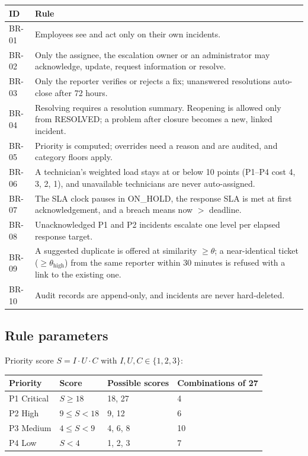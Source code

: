 \begin{longtable}{@{}l>{\raggedright\arraybackslash}p{12cm}@{}}
\toprule
\textbf{ID} & \textbf{Rule} \\
\midrule
\endhead
BR-01 & Employees see and act only on their own incidents. \\
BR-02 & Only the assignee, the escalation owner or an administrator may acknowledge, update,
  request information or resolve. \\
BR-03 & Only the reporter verifies or rejects a fix; unanswered resolutions auto-close after
  72 hours. \\
BR-04 & Resolving requires a resolution summary. Reopening is allowed only from RESOLVED; a
  problem after closure becomes a new, linked incident. \\
BR-05 & Priority is computed; overrides need a reason and are audited, and category floors
  apply. \\
BR-06 & A technician's weighted load stays at or below 10 points (P1--P4 cost 4, 3, 2, 1), and
  unavailable technicians are never auto-assigned. \\
BR-07 & The SLA clock pauses in ON\_HOLD, the response SLA is met at first acknowledgement, and
  a breach means now $>$ deadline. \\
BR-08 & Unacknowledged P1 and P2 incidents escalate one level per elapsed response target. \\
BR-09 & A suggested duplicate is offered at similarity $\geq \theta$; a near-identical ticket
  ($\geq \theta_{\text{high}}$) from the same reporter within 30 minutes is refused with a link
  to the existing one. \\
BR-10 & Audit records are append-only, and incidents are never hard-deleted. \\
\bottomrule
\end{longtable}

\subsection*{Rule parameters}

Priority score $S = I \cdot U \cdot C$ with $I, U, C \in \{1, 2, 3\}$:

\begin{center}\small
\begin{tabular}{@{}llll@{}}
\toprule
\textbf{Priority} & \textbf{Score} & \textbf{Possible scores} & \textbf{Combinations of 27} \\
\midrule
P1 Critical & $S \geq 18$ & 18, 27 & 4 \\
P2 High & $9 \leq S < 18$ & 9, 12 & 6 \\
P3 Medium & $4 \leq S < 9$ & 4, 6, 8 & 10 \\
P4 Low & $S < 4$ & 1, 2, 3 & 7 \\
\bottomrule
\end{tabular}
\end{center}

